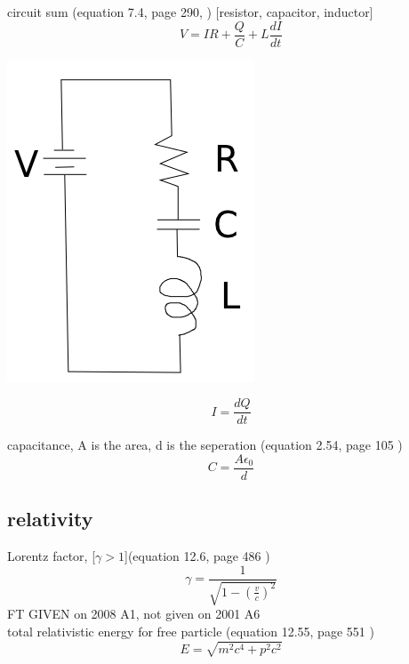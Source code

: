 \documentclass[12pt]{article}  %
\def\qualifyingyear{F}
\begin{document}
circuit sum (equation 7.4, page 290, \cite{GriffithED}) [resistor, capacitor, inductor]
\begin{equation}
V = IR + \frac{Q}{C} + L \frac{dI}{dt}
\end{equation}
 \begin{center}
  \includegraphics[scale=0.3]{pictures/V_R_C_L}
 \end{center}

\begin{equation}
I = \frac{dQ}{dt}
\end{equation}

capacitance, A is the area, d is the seperation (equation 2.54, page 105 \cite{GriffithED})
\begin{equation}
C = \frac{A \epsilon_0}{d}
\end{equation}


\subsection{relativity}

Lorentz factor, [$\gamma > 1$](equation 12.6, page 486 \cite{GriffithED})
\begin{equation}
\gamma = \frac{1}{\sqrt{1-(\frac{v}{c})^2}}
\label{eq:gamma}
\end{equation}
\if\qualifyingyear T
GIVEN on 2008 A1, not given on 2001 A6\\ 
\fi
 total relativistic energy for free particle (equation 12.55, page 551 \cite{GriffithED})
\begin{equation}
  E = \sqrt{m^2 c^4 + p^2 c^2}
	\label{eq:relativistic_energy}
\end{equation}
\end{document}
